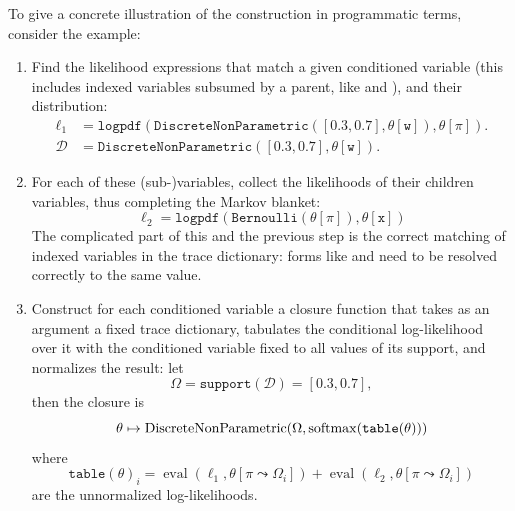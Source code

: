 To give a concrete illustration of the construction in programmatic terms, consider the
 example:
\begin{enumerate}
  \firmlist
\item Find the likelihood expressions that match a given conditioned variable (this includes indexed
  variables subsumed by a parent, like  and ), and their distribution:
  \begin{equation*}
    \begin{aligned}
      \ell_{1} &= \mathtt{logpdf(DiscreteNonParametric([0.3, 0.7],\theta[w]), \theta[\pi])}. \\
      \mathcal{D} &= \mathtt{DiscreteNonParametric([0.3, 0.7], \theta[w])}.
    \end{aligned}
  \end{equation*}
\item For each of these (sub-)variables, collect the likelihoods of their children variables, thus
  completing the Markov blanket:
  \begin{equation*}
    \ell_{2} = \mathtt{logpdf(Bernoulli(\theta[\pi]), \theta[x])}
  \end{equation*}
  The complicated part of this and the previous step is the correct matching of indexed variables in
  the trace dictionary: forms like  and  need to be resolved correctly
  to the same value.
\item Construct for each conditioned variable a closure function that takes as an argument a fixed
  trace dictionary, tabulates the conditional log-likelihood over it with the conditioned variable
  fixed to all values of its support, and normalizes the result: let
  \begin{equation*}
    \Omega = \mathtt{support}(\mathcal{D}) = \mathtt{[0.3, 0.7]},
  \end{equation*}
  then the closure is
  \begin{equation*}
    \theta \mapsto \mathrm{DiscreteNonParametric}(\Omega, \operatorname{softmax}(\mathtt{table}(\theta)))
  \end{equation*}
  where
  \begin{equation*}
    \mathtt{table}(\theta)_i = \operatorname{eval}(\ell_{1}, \theta[\pi \leadsto \Omega_i]) +
    \operatorname{eval}(\ell_{2}, \theta[\pi \leadsto \Omega_i])
  \end{equation*}
  are the unnormalized log-likelihoods.

\end{enumerate}
